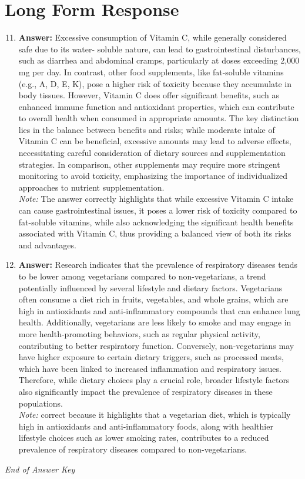 \documentclass[12pt]{article}
\begin{document}
\section*{Long Form Response}
\begin{enumerate}[label=\arabic*.]
\setcounter{enumi}{10}
\item \textbf{Answer:} Excessive consumption of Vitamin C, while generally considered safe due to its water- soluble nature, can lead to gastrointestinal disturbances, such as diarrhea and abdominal cramps, particularly at doses exceeding 2,000 mg per day. In contrast, other food supplements, like fat-soluble vitamins (e.g., A, D, E, K), pose a higher risk of toxicity because they accumulate in body tissues. However, Vitamin C does offer significant benefits, such as enhanced immune function and antioxidant properties, which can contribute to overall health when consumed in appropriate amounts. The key distinction lies in the balance between benefits and risks; while moderate intake of Vitamin C can be beneficial, excessive amounts may lead to adverse effects, necessitating careful consideration of dietary sources and supplementation strategies. In comparison, other supplements may require more stringent monitoring to avoid toxicity, emphasizing the importance of individualized approaches to nutrient supplementation.
\\ \textit{Note:} The answer correctly highlights that while excessive Vitamin C intake can cause gastrointestinal issues, it poses a lower risk of toxicity compared to fat-soluble vitamins, while also acknowledging the significant health benefits associated with Vitamin C, thus providing a balanced view of both its risks and advantages.
\item \textbf{Answer:} Research indicates that the prevalence of respiratory diseases tends to be lower among vegetarians compared to non-vegetarians, a trend potentially influenced by several lifestyle and dietary factors. Vegetarians often consume a diet rich in fruits, vegetables, and whole grains, which are high in antioxidants and anti-inflammatory compounds that can enhance lung health. Additionally, vegetarians are less likely to smoke and may engage in more health-promoting behaviors, such as regular physical activity, contributing to better respiratory function. Conversely, non-vegetarians may have higher exposure to certain dietary triggers, such as processed meats, which have been linked to increased inflammation and respiratory issues. Therefore, while dietary choices play a crucial role, broader lifestyle factors also significantly impact the prevalence of respiratory diseases in these populations.
\\ \textit{Note:} correct because it highlights that a vegetarian diet, which is typically high in antioxidants and anti-inflammatory foods, along with healthier lifestyle choices such as lower smoking rates, contributes to a reduced prevalence of respiratory diseases compared to non-vegetarians.
\end{enumerate}

\vfill
\noindent\textit{End of Answer Key}
\end{document}
